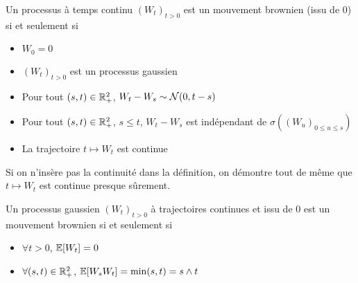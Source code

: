 \begin{definition}
  Un processus à temps continu $(W_t)_{t>0}$ est un mouvement brownien (issu de 0) si et seulement si
\begin{itemize}
\item $W_0 = 0$ 
\item $(W_t)_{t>0}$ est un processus gaussien 
\item Pour tout $(s,t)\in\mathbb{R}^2_+$, $W_t-W_s \sim \mathcal{N}(0,t-s)$ 
\item Pour tout $(s,t) \in \mathbb{R}^2_+$, $s\leq t$, $W_t -W_s $ est indépendant de $\sigma((W_u)_{0\leq u \leq s})$ 
\item La trajectoire $t \mapsto W_t$ est continue
\end{itemize}

Si on n'insère pas la continuité dans la définition, on démontre tout de même que $t\mapsto W_t$ est continue presque sûrement.
\end{definition}
\begin{prop}
  Un processus gaussien $(W_t)_{t>0}$ à trajectoires continues et issu de 0 est un mouvement brownien si et seulement si
  \begin{itemize}
    \item $\forall t>0$, $\mathbb{E}[W_t] = 0$
    \item $\forall (s,t)\in\mathbb{R}^2_+$, $\mathbb{E}[W_sW_t] = \min(s,t) = s\wedge t$
  \end{itemize}
\label{prop_brownien}
\end{prop}

